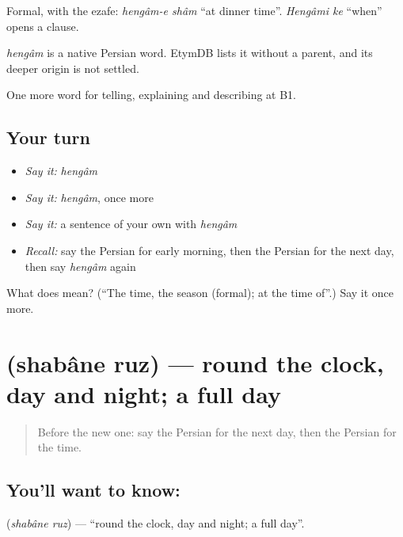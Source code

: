 Formal, with the ezafe: \emph{hengâm-e shâm} \textquotedblleft{}at dinner time\textquotedblright{}. \emph{Hengâmi ke} \textquotedblleft{}when\textquotedblright{} opens a clause.

\begin{cousinweb}
\emph{hengâm} is a native Persian word. EtymDB lists it without a parent, and its deeper origin is not settled.
\end{cousinweb}

\begin{grammarlens}[title={What you've built}]
One more word for telling, explaining and describing at B1.
\end{grammarlens}

\subsection*{Your turn}
\begin{itemize}
\raggedright
  \item \emph{Say it:} \emph{hengâm}
  \item \emph{Say it:} \emph{hengâm}, once more
  \item \emph{Say it:} a sentence of your own with \emph{hengâm}
  \item \emph{Recall:} say the Persian for early morning, then the Persian for the next day, then say \emph{hengâm} again
\end{itemize}

\begin{tcolorbox}[breakable,colback=teal!4,colframe=teal!35!black,title={Before you move on}]
What does  mean? (\textquotedblleft{}The time, the season (formal); at the time of\textquotedblright{}.) Say it once more.
\end{tcolorbox}
\section[\texorpdfstring{\fa{شبانه} \fa{روز} (shabâne ruz)}{شبانه روز (shabâne ruz)}]{  (shabâne ruz) — round the clock, day and night; a full day}

\label{lesson:FA-C305-shabane-ruz}



\begin{quote}
Before the new one: say the Persian for the next day, then the Persian for the time.
\end{quote}

\subsection*{You'll want to know:  }
\textbf{ } (\emph{shabâne ruz}) — \textquotedblleft{}round the clock, day and night; a full day\textquotedblright{}.

